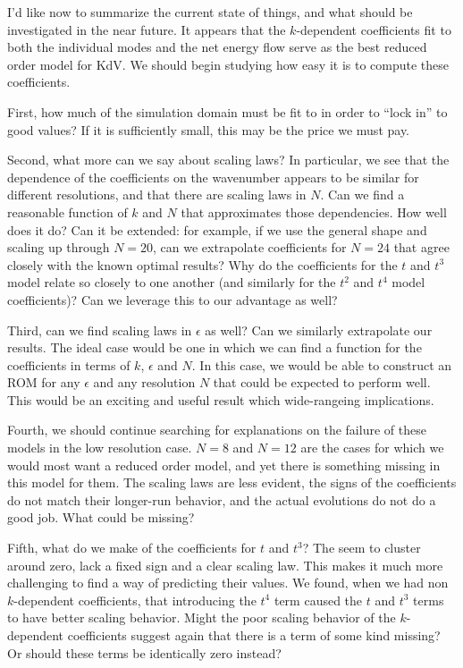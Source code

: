 \documentclass{article}
\begin{document}
I'd like now to summarize the current state of things, and what should be investigated in the near future. It appears that the $k$-dependent coefficients fit to both the individual modes and the net energy flow serve as the best reduced order model for KdV. We should begin studying how easy it is to compute these coefficients.

First, how much of the simulation domain must be fit to in order to ``lock in'' to good values? If it is sufficiently small, this may be the price we must pay.

Second, what more can we say about scaling laws? In particular, we see that the dependence of the coefficients on the wavenumber appears to be similar for different resolutions, and that there are scaling laws in $N$. Can we find a reasonable function of $k$ and $N$ that approximates those dependencies. How well does it do? Can it be extended: for example, if we use the general shape  and scaling up through $N = 20$, can we extrapolate coefficients for $N=24$ that agree closely with the known optimal results? Why do the coefficients for the $t$ and $t^3$ model relate so closely to one another (and similarly for the $t^2$ and $t^4$ model coefficients)? Can we leverage this to our advantage as well?

Third, can we find scaling laws in $\epsilon$ as well? Can we similarly extrapolate our results. The ideal case would be one in which we can find a function for the coefficients in terms of $k$, $\epsilon$ and $N$. In this case, we would be able to construct an ROM for any $\epsilon$ and any resolution $N$ that could be expected to perform well. This would be an exciting and useful result which wide-rangeing implications.

Fourth, we should continue searching for explanations on the failure of these models in the low resolution case. $N=8$ and $N=12$ are the cases for which we would most want a reduced order model, and yet there is something missing in this model for them. The scaling laws are less evident, the signs of the coefficients do not match their longer-run behavior, and the actual evolutions do not do a good job. What could be missing?

Fifth, what do we make of the coefficients for $t$ and $t^3$? The seem to cluster around zero, lack a fixed sign and a clear scaling law. This makes it much more challenging to find a way of predicting their values. We found, when we had non $k$-dependent coefficients, that introducing the $t^4$ term caused the $t$ and $t^3$ terms to have better scaling behavior. Might the poor scaling behavior of the $k$-dependent coefficients suggest again that there is a term of some kind missing? Or should these terms be identically zero instead?
\end{document}
